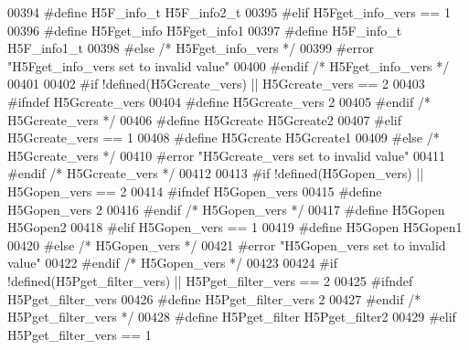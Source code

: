 \begin{DoxyCode}
00394 \textcolor{preprocessor}{  #define H5F\_info\_t H5F\_info2\_t}
00395 \textcolor{preprocessor}{#elif H5Fget\_info\_vers == 1}
00396 \textcolor{preprocessor}{  #define H5Fget\_info H5Fget\_info1}
00397 \textcolor{preprocessor}{  #define H5F\_info\_t H5F\_info1\_t}
00398 \textcolor{preprocessor}{#else }\textcolor{comment}{/* H5Fget\_info\_vers */}\textcolor{preprocessor}{}
00399 \textcolor{preprocessor}{  #error "H5Fget\_info\_vers set to invalid value"}
00400 \textcolor{preprocessor}{#endif }\textcolor{comment}{/* H5Fget\_info\_vers */}\textcolor{preprocessor}{}
00401 
00402 \textcolor{preprocessor}{#if !defined(H5Gcreate\_vers) || H5Gcreate\_vers == 2}
00403 \textcolor{preprocessor}{  #ifndef H5Gcreate\_vers}
00404 \textcolor{preprocessor}{    #define H5Gcreate\_vers 2}
00405 \textcolor{preprocessor}{  #endif }\textcolor{comment}{/* H5Gcreate\_vers */}\textcolor{preprocessor}{}
00406 \textcolor{preprocessor}{  #define H5Gcreate H5Gcreate2}
00407 \textcolor{preprocessor}{#elif H5Gcreate\_vers == 1}
00408 \textcolor{preprocessor}{  #define H5Gcreate H5Gcreate1}
00409 \textcolor{preprocessor}{#else }\textcolor{comment}{/* H5Gcreate\_vers */}\textcolor{preprocessor}{}
00410 \textcolor{preprocessor}{  #error "H5Gcreate\_vers set to invalid value"}
00411 \textcolor{preprocessor}{#endif }\textcolor{comment}{/* H5Gcreate\_vers */}\textcolor{preprocessor}{}
00412 
00413 \textcolor{preprocessor}{#if !defined(H5Gopen\_vers) || H5Gopen\_vers == 2}
00414 \textcolor{preprocessor}{  #ifndef H5Gopen\_vers}
00415 \textcolor{preprocessor}{    #define H5Gopen\_vers 2}
00416 \textcolor{preprocessor}{  #endif }\textcolor{comment}{/* H5Gopen\_vers */}\textcolor{preprocessor}{}
00417 \textcolor{preprocessor}{  #define H5Gopen H5Gopen2}
00418 \textcolor{preprocessor}{#elif H5Gopen\_vers == 1}
00419 \textcolor{preprocessor}{  #define H5Gopen H5Gopen1}
00420 \textcolor{preprocessor}{#else }\textcolor{comment}{/* H5Gopen\_vers */}\textcolor{preprocessor}{}
00421 \textcolor{preprocessor}{  #error "H5Gopen\_vers set to invalid value"}
00422 \textcolor{preprocessor}{#endif }\textcolor{comment}{/* H5Gopen\_vers */}\textcolor{preprocessor}{}
00423 
00424 \textcolor{preprocessor}{#if !defined(H5Pget\_filter\_vers) || H5Pget\_filter\_vers == 2}
00425 \textcolor{preprocessor}{  #ifndef H5Pget\_filter\_vers}
00426 \textcolor{preprocessor}{    #define H5Pget\_filter\_vers 2}
00427 \textcolor{preprocessor}{  #endif }\textcolor{comment}{/* H5Pget\_filter\_vers */}\textcolor{preprocessor}{}
00428 \textcolor{preprocessor}{  #define H5Pget\_filter H5Pget\_filter2}
00429 \textcolor{preprocessor}{#elif H5Pget\_filter\_vers == 1}

\end{DoxyCode}
